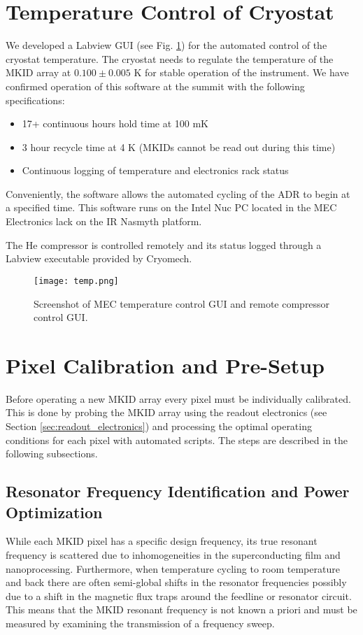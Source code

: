 \documentclass[../main.tex]{subfiles}
\begin{document}
\section{Temperature Control of Cryostat}
We developed a Labview GUI (see Fig. \ref{fig:temp}) for the automated control of the cryostat temperature. The cryostat needs to regulate the temperature of the MKID array at $0.100 \pm 0.005$ K for stable operation of the instrument. We have confirmed operation of this software at the summit with the following specifications:
\begin{itemize}
\item 17+ continuous hours hold time at 100 mK
\item 3 hour recycle time at 4 K (MKIDs cannot be read out during this time)
\item Continuous logging of temperature and electronics rack status
\end{itemize}
Conveniently, the software allows the automated cycling of the ADR to begin at a specified time. This software runs on the Intel Nuc PC located in the MEC Electronics lack on the IR Nasmyth platform. 

The He compressor is controlled remotely and its status logged through a Labview executable provided by Cryomech. 

\begin{figure}[t]
  \centering
    \texttt{[image: temp.png]}
  \caption[MEC Temperature Control GUI]{Screenshot of MEC temperature control GUI and remote compressor control GUI.}
  \label{fig:temp}
\end{figure}

\section{Pixel Calibration and Pre-Setup}
Before operating a new MKID array every pixel must be individually calibrated. This is done by probing the MKID array using the readout electronics (see Section \ref{sec:readout_electronics}) and processing the optimal operating conditions for each pixel with automated scripts. The steps are described in the following subsections.

\subsection{Resonator Frequency Identification and Power Optimization}
While each MKID pixel has a specific design frequency, its true resonant frequency is scattered due to inhomogeneities in the superconducting film and nanoprocessing. Furthermore, when temperature cycling to room temperature and back there are often semi-global shifts in the resonator frequencies possibly due to a shift in the magnetic flux traps around the feedline or resonator circuit. This means that the MKID resonant frequency is not known a priori and must be measured by examining the transmission of a frequency sweep. 
\end{document}

